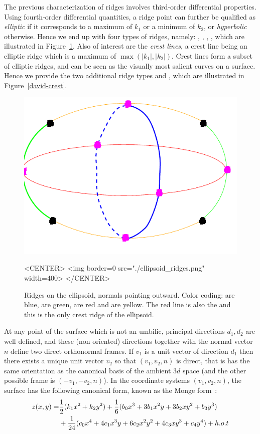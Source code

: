 The previous characterization of ridges involves third-order
differential properties. Using fourth-order differential quantities, a
ridge point can further be qualified as {\em elliptic} if it
corresponds to a maximum of $k_1$ or a minimum of $k_2$, or {\em
hyperbolic} otherwise. Hence we end up with four types of ridges, namely:
 , , ,
, which are illustrated in  Figure~\ref{ellipsoid-ridges}.
Also of interest are the {\em crest lines}, a crest line being an
elliptic ridge which is a maximum of $\max(|k_1|,|k_2|)$. Crest lines
form a subset of elliptic ridges, and can be seen as the visually most
salient curves on a surface.
Hence we provide the two additional ridge types
 and , which are illustrated  in
Figure~\ref{david-crest}.

\begin{figure}[!ht]
\begin{ccTexOnly}
\centerline{
\includegraphics[width=.5\linewidth]{Ridges_3/ellipsoid_ridges}}
\end{ccTexOnly}

\begin{ccHtmlOnly}
<CENTER> <img border=0 src="./ellipsoid_ridges.png" width=400>
</CENTER>
\end{ccHtmlOnly}
\caption{Ridges on the ellipsoid, normals pointing outward.  Color
  coding:  are blue,
   are green,  are
  red and  are yellow. The red line is also
  the  and this is the only crest ridge of the
  ellipsoid.}
\label{ellipsoid-ridges}
\end{figure}

At any point of the surface which is not an umbilic, principal
directions $d_1, d_2$ are well defined, and these (non oriented)
directions together with the normal vector $n$ define two direct
orthonormal frames. If $v_1$ is a unit vector of direction $d_1$ then
there exists a unique unit vector $v_2$ so that $(v_1,v_2,n)$ is
direct, that is has the same orientation as the canonical basis of the
ambient $3d$ space (and the other possible frame is $(-v_1,-v_2,n)$). In the
coordinate systems $(v_1,v_2,n)$, the surface has the following
canonical form, known as the Monge form~:
%
\begin{eqnarray}
\label{eq:monge}
z(x,y) =  & \frac{1}{2}(k_1x^2 + k_2y^2)+
	\frac{1}{6}(b_0x^3+3b_1x^2y+3b_2xy^2+b_3y^3) \\
  &  +\frac{1}{24}(c_0x^4+4c_1x^3y+6c_2x^2y^2+4c_3xy^3+c_4y^4) + h.o.t
\end{eqnarray}

